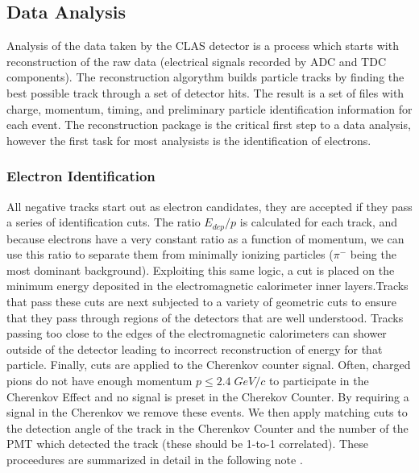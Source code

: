 
\subsection{Data Analysis}
Analysis of the data taken by the CLAS detector is a process which starts with reconstruction of the raw data (electrical signals recorded by ADC and TDC components).  The reconstruction algorythm builds particle tracks by finding the best possible track through a set of detector hits.  The result is a set of files with charge, momentum, timing, and preliminary particle identification information for each event.  The reconstruction package is the critical first step to a data analysis, however the first task for most analysists is the identification of electrons.

\subsubsection{Electron Identification}
All negative tracks start out as electron candidates, they are accepted if they pass a series of identification cuts. The ratio $E_{dep}/p$ is calculated for each track, and because electrons have a very constant ratio as a function of momentum, we can use this ratio to separate them from minimally ionizing particles ($\pi^{-}$ being the most dominant background).  Exploiting this same logic, a cut is placed on the minimum energy deposited in the electromagnetic calorimeter inner layers.Tracks that pass these cuts are next subjected to a variety of geometric cuts to ensure that they pass through regions of the detectors that are well understood.  Tracks passing too close to the edges of the electromagnetic calorimeters can shower outside of the detector leading to incorrect reconstruction of energy for that particle.  Finally, cuts are applied to the Cherenkov counter signal.  Often, charged pions do not have enough momentum $p \leq 2.4 \; GeV/c$ to participate in the Cherenkov Effect and no signal is preset in the Cherekov Counter.  By requiring a signal in the Cherenkov we remove these events.  We then apply matching cuts to the detection angle of the track in the Cherenkov Counter and the number of the PMT which detected the track (these should be 1-to-1 correlated).  These proceedures are summarized in detail in the following note \cite{electron-note}.

